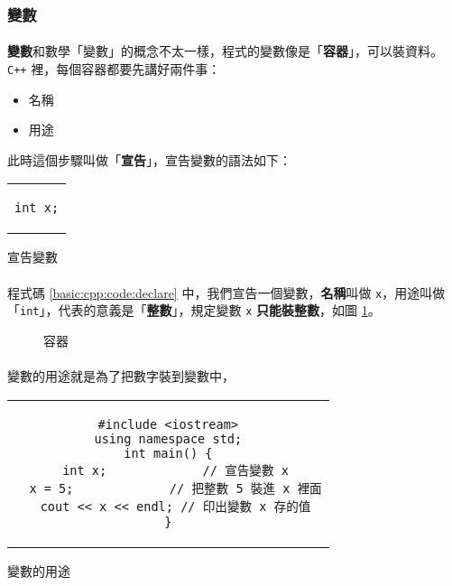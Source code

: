 \documentclass[12pt,a4paper,oneside]{article}
\begin{document}
\begin{CJK}{UTF8}{bkai}
\subsubsection{變數}

\paragraph{}\textbf{變數}和數學「變數」的概念不太一樣，程式的變數像是「\textbf{容器}」，可以裝資料。\texttt{C++} 裡，每個容器都要先講好兩件事：
\begin{itemize}
\item 名稱
\item 用途
\end{itemize}
此時這個步驟叫做「\textbf{宣告}」，宣告變數的語法如下：

\begin{code}[h!]
\centering
\begin{tabular}{c}
\begin{lstlisting}
int x;
\end{lstlisting}
\end{tabular}
\caption{宣告變數}
\label{basic:cpp:code:declare}
\end{code}

\paragraph{}程式碼 \ref{basic:cpp:code:declare} 中，我們宣告一個變數，\textbf{名稱}叫做 \lstinline!x!，用途叫做「\lstinline!int!」，代表的意義是「\textbf{整數}」，規定變數 \lstinline!x! \textbf{只能裝整數}，如圖 \ref{basic:cpp:fig:variable}。

\begin{figure}[h]
\centering
{}
\caption{容器}
\label{basic:cpp:fig:variable}
\end{figure}

\paragraph{}變數的用途就是為了把數字裝到變數中，
\begin{code}[h!]
\centering
\begin{tabular}{c}
\begin{lstlisting}
#include <iostream>
using namespace std;
int main() {
  int x;             // 宣告變數 x
  x = 5;             // 把整數 5 裝進 x 裡面
  cout << x << endl; // 印出變數 x 存的值
}
\end{lstlisting}
\end{tabular}
\caption{變數的用途}
\label{basic:cpp:code:use:variable}
\end{code}


\end{CJK}
\end{document}
